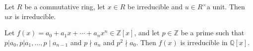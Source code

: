 \begin{proofidea}
  
  
\end{proofidea}
  
\begin{formalproof}
  
\end{formalproof} 

\begin{lemma}
Let \(R\) be a commutative ring, let \(x \in R\) be irreducible and \(u \in R^{\times}\)a unit. Then \(u x\) is irreducible. 
\end{lemma}

\begin{proposition}
Let \(f(x)=a_0+a_1 x+\cdots+a_n x^n \in \mathbb{Z}[x]\), and let \(p \in \mathbb{Z}\) be a prime such that \(p\left|a_0, p\right| a_1, \ldots, p \mid a_{n-1}\) and \(p \nmid a_n\) and \(p^2 \nmid a_0\). Then \(f(x)\) is irreducible in \(\mathbb{Q}[x]\).
\end{proposition}

\begin{proofidea}
  
  
\end{proofidea}
  
\begin{formalproof}
  
\end{formalproof}


